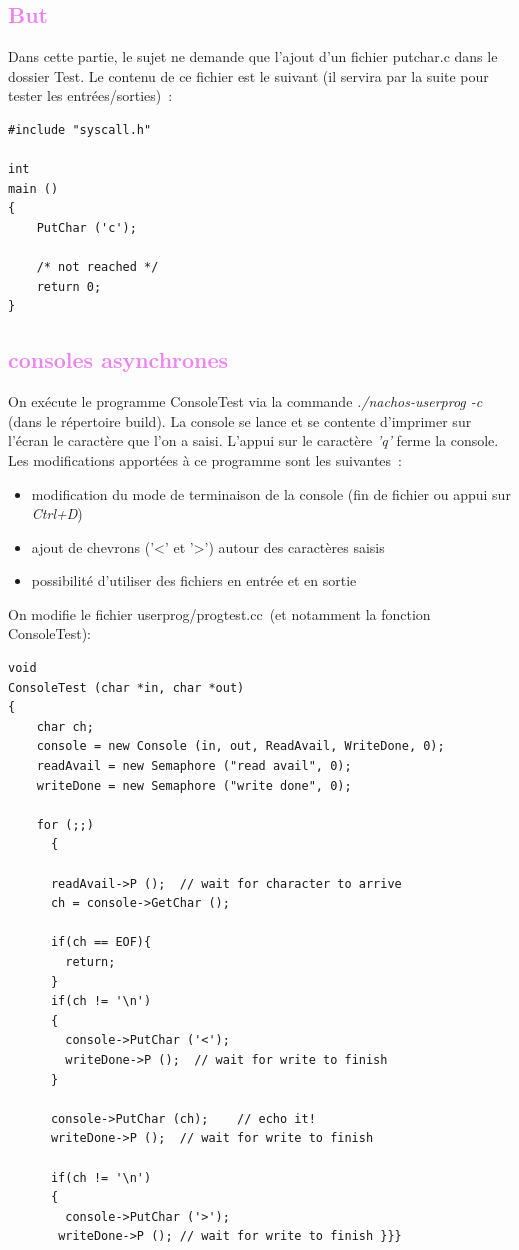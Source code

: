 \documentclass[a4paper,10pt]{report}
\begin{document}
  \textcolor{Violet}{\section{But}}
  Dans cette partie, le sujet ne demande que l'ajout d'un fichier putchar.c dans le dossier Test. 
  Le contenu de ce fichier est le suivant (il servira par la suite pour tester les entrées/sorties) :
  \begin{lstlisting}
#include "syscall.h"

int
main ()
{
    PutChar ('c');

    /* not reached */
    return 0;
}   
  \end{lstlisting}
  \newpage
 \textcolor{Violet}{\section{consoles asynchrones}}
 On exécute le programme ConsoleTest via la commande \emph{./nachos-userprog -c} (dans le répertoire build). 
 La console se lance et se contente d'imprimer sur l'écran le caractère que l'on a saisi. L'appui sur le caractère \emph{'q'} ferme la console.
 Les modifications apportées à ce programme sont les suivantes :
 \begin{itemize}
  \item modification du mode de terminaison de la console (fin de fichier ou appui sur \emph{Ctrl+D})
  \item ajout de chevrons ('<' et '>') autour des caractères saisis
  \item possibilité d'utiliser des fichiers en entrée et en sortie
 \end{itemize}
On modifie le fichier userprog/progtest.cc (et notamment la fonction ConsoleTest):
\begin{lstlisting}
void
ConsoleTest (char *in, char *out)
{
    char ch;
    console = new Console (in, out, ReadAvail, WriteDone, 0);
    readAvail = new Semaphore ("read avail", 0);
    writeDone = new Semaphore ("write done", 0);

    for (;;)
      {

	  readAvail->P ();	// wait for character to arrive
	  ch = console->GetChar ();

      if(ch == EOF){
        return;
      }
      if(ch != '\n')
      {
        console->PutChar ('<');
        writeDone->P ();  // wait for write to finish
      }

	  console->PutChar (ch);	// echo it!
      writeDone->P ();  // wait for write to finish

      if(ch != '\n')
      {
        console->PutChar ('>');
	   writeDone->P ();	// wait for write to finish }}}
\end{lstlisting}
\end{document}
